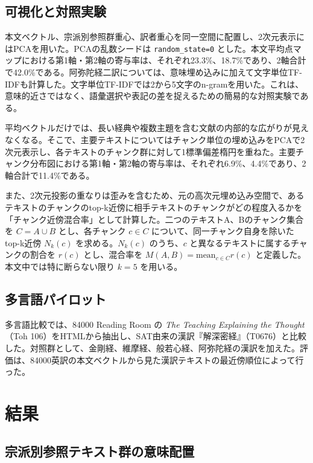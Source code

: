 \documentclass[uplatex,dvipdfmx,11pt,a4paper]{jsarticle}
\begin{document}
\subsection{可視化と対照実験}

本文ベクトル、宗派別参照群重心、訳者重心を同一空間に配置し、2次元表示にはPCAを用いた。PCAの乱数シードは \texttt{random\_state=0} とした。本文平均点マップにおける第1軸・第2軸の寄与率は、それぞれ23.3\%、18.7\%であり、2軸合計で42.0\%である。阿弥陀経二訳については、意味埋め込みに加えて文字単位TF-IDFも計算した。文字単位TF-IDFでは2から5文字のn-gramを用いた。これは、意味的近さではなく、語彙選択や表記の差を捉えるための簡易的な対照実験である。

平均ベクトルだけでは、長い経典や複数主題を含む文献の内部的な広がりが見えなくなる。そこで、主要テキストについてはチャンク単位の埋め込みをPCAで2次元表示し、各テキストのチャンク群に対して1標準偏差楕円を重ねた。主要チャンク分布図における第1軸・第2軸の寄与率は、それぞれ6.9\%、4.4\%であり、2軸合計で11.4\%である。

また、2次元投影の重なりは歪みを含むため、元の高次元埋め込み空間で、あるテキストのチャンクのtop-k近傍に相手テキストのチャンクがどの程度入るかを「チャンク近傍混合率」として計算した。二つのテキストA、Bのチャンク集合を $C=A\cup B$ とし、各チャンク $c\in C$ について、同一チャンク自身を除いたtop-k近傍 $N_k(c)$ を求める。$N_k(c)$ のうち、$c$ と異なるテキストに属するチャンクの割合を $r(c)$ とし、混合率を $M(A,B)=\mathrm{mean}_{c\in C} r(c)$ と定義した。本文中では特に断らない限り $k=5$ を用いる。

\subsection{多言語パイロット}

多言語比較では、84000 Reading Room の \textit{The Teaching Explaining the Thought}（Toh 106）をHTMLから抽出し、SAT由来の漢訳『解深密経』（T0676）と比較した。対照群として、金剛経、維摩経、般若心経、阿弥陀経の漢訳を加えた。評価は、84000英訳の本文ベクトルから見た漢訳テキストの最近傍順位によって行った。

\section{結果}

\subsection{宗派別参照テキスト群の意味配置}
\end{document}
